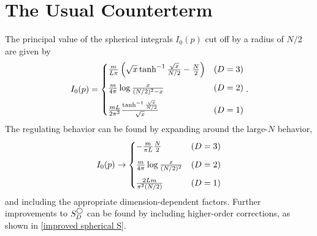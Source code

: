 \section{The Usual Counterterm}\label{sec:counterterm/spherical}

The principal value of the spherical integrals $I_0(p)$ cut off by a radius of $N/2$ are given by
\begin{equation}
    I_0(p) = \begin{cases}
        \frac{m}{L\pi}\left(\sqrt{x}\tanh^{-1}\frac{\sqrt{x}}{N/2} - \frac{N}{2}\right)
            &   (D=3)\\[0.25cm]
        \frac{m}{4\pi} \log \frac{x}{(N/2)^2-x}
            &   (D=2)\\[0.25cm]
        \frac{m L}{2\pi^2} \frac{\tanh^{-1} \frac{\sqrt{x}}{N/2}}{\sqrt{x}}                     &   (D=1)
    \end{cases}.
\end{equation}
The regulating behavior can be found by expanding around the large-$N$ behavior,
\begin{equation}
    I_0(p) \rightarrow \begin{cases}
        -\frac{m}{\pi L}\frac{N}{2}
            &   (D=3)\\[0.25cm]
        \frac{m}{4\pi} \log \frac{x}{(N/2)^2}
            &   (D=2)\\[0.25cm]
        \frac{2 L m}{\pi^2 (N/2)}
            &   (D=1)
    \end{cases}
\end{equation}
and including the appropriate dimension-dependent factors.
Further improvements to $S_D^\bigcirc$ can be found by including higher-order corrections, as shown in \eqref{improved spherical S}.
